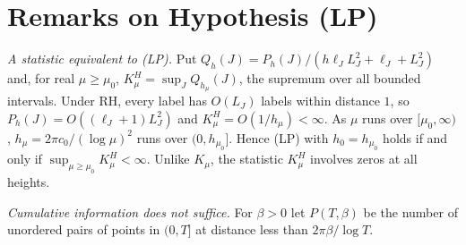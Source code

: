 \documentclass[11pt]{amsart}
\theoremstyle{definition}
\theoremstyle{remark}
\numberwithin{equation}{section}
\begin{document}
\section{Remarks on Hypothesis (LP)}\label{sec:LP}

\emph{A statistic equivalent to (LP).} Put $Q_h(J)=P_h(J)/(h\ell_JL_J^2+\ell_J+L_J^2)$ and, for real $\mu\ge\mu_0$, $K^H_\mu=\sup_JQ_{h_\mu}(J)$, the supremum over all bounded intervals. Under RH, every label has $O(L_J)$ labels within distance $1$, so $P_h(J)=O((\ell_J+1)L_J^2)$ and $K^H_\mu=O(1/h_\mu)<\infty$. As $\mu$ runs over $[\mu_0,\infty)$, $h_\mu=2\pi c_0/(\log\mu)^2$ runs over $(0,h_{\mu_0}]$. Hence (LP) with $h_0=h_{\mu_0}$ holds if and only if $\sup_{\mu\ge\mu_0}K^H_\mu<\infty$. Unlike $K_\mu$, the statistic $K^H_\mu$ involves zeros at all heights.

\emph{Cumulative information does not suffice.} For $\beta>0$ let $P(T,\beta)$ be the number of unordered pairs of points in $(0,T]$ at distance less than $2\pi\beta/\log T$.
\end{document}
